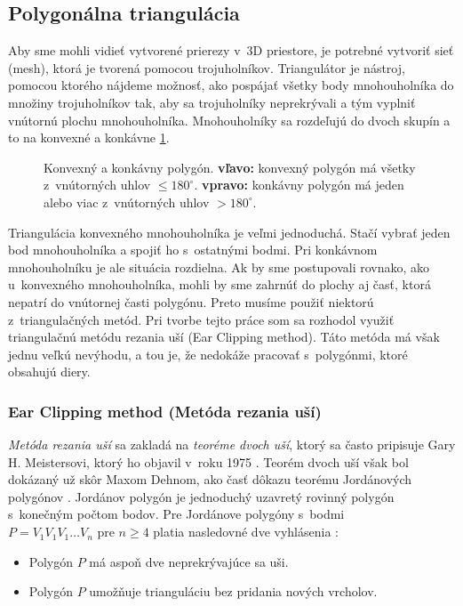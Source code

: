 \subsection{Polygonálna triangulácia}
Aby sme mohli vidieť vytvorené prierezy v~3D priestore, je potrebné vytvoriť sieť (mesh), ktorá je tvorená pomocou trojuholníkov.
Triangulátor je nástroj, pomocou ktorého nájdeme možnosť, ako pospájať všetky body mnohouholníka do množiny trojuholníkov tak, aby sa trojuholníky neprekrývali a tým vyplniť vnútornú plochu mnohouholníka. Mnohouholníky sa rozdeľujú do dvoch skupín a to na konvexné a konkávne \ref{fig:Convex-Concave}. 

\begin{figure}[!h]
  \centering
  \quad
  \caption{Konvexný a konkávny polygón. \textbf{vľavo:} konvexný polygón má všetky z~vnútorných uhlov $\leq 180^\circ$. \textbf{vpravo:} konkávny polygón má jeden alebo viac z~vnútorných uhlov $> 180^\circ$.}
  \label{fig:Convex-Concave}
\end{figure}

Triangulácia konvexného mnohouholníka je veľmi jednoduchá. Stačí vybrať jeden bod mnohouholníka a spojiť ho s~ostatnými bodmi. Pri konkávnom mnohouholníku je ale situácia rozdielna. Ak by sme postupovali rovnako, ako u~konvexného mnohouholníka, mohli by sme zahrnúť do plochy aj časť, ktorá nepatrí do vnútornej časti polygónu. Preto musíme použiť niektorú z~triangulačných metód. 
Pri tvorbe tejto práce som sa rozhodol využiť triangulačnú metódu rezania uší (Ear Clipping method). Táto metóda má však jednu veľkú nevýhodu, a tou je, že nedokáže pracovať s~polygónmi, ktoré obsahujú diery.

\subsubsection{Ear Clipping method (Metóda rezania uší)}


\textit{Metóda rezania uší} sa zakladá na \textit{teoréme dvoch uší}, ktorý sa často pripisuje Gary H. Meistersovi, ktorý ho objavil v~roku 1975 \cite{Meisters:PolygonsHaveEars:2905438}.
Teorém dvoch uší však bol dokázaný už skôr Maxom Dehnom, ako časť dôkazu teorému Jordánových polygónov \cite{Max_Dehn:41133486}.
{Jordánov polygón} je jednoduchý uzavretý rovinný polygón s~konečným počtom bodov. 
Pre Jordánove polygóny s~bodmi $P = V_{1}V_{1}V_{1} \dots V_{n} \text{ pre } n \geq 4$ platia nasledovné dve vyhlásenia \cite{Meisters:PolygonsHaveEars:2905438}:
\begin{itemize}
\item Polygón $P$ má aspoň dve neprekrývajúce sa uši.
\item Polygón $P$ umožňuje trianguláciu bez pridania nových vrcholov.
\end{itemize}

